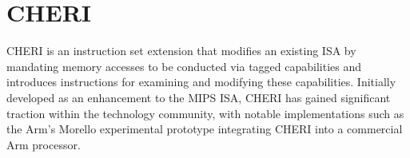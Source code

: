 \section{CHERI}


CHERI\cite{woodruff_cheri_2019} is an instruction set extension that modifies an existing ISA by mandating memory accesses to be conducted via tagged 
capabilities and introduces instructions for examining and modifying these capabilities. Initially developed as an 
enhancement to the MIPS ISA, CHERI has gained significant traction within the technology community, 
with notable implementations such as the Arm's Morello\cite{noauthor_arm_nodate} experimental prototype integrating CHERI into a 
commercial Arm processor.
\newline

